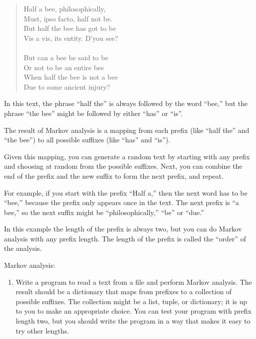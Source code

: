 \documentclass[10pt]{book}
\begin{document}
{\begin{quote}
Half a bee, philosophically, \\
Must, ipso facto, half not be. \\
But half the bee has got to be \\
Vis a vis, its entity. D'you see? \\
\\
But can a bee be said to be \\
Or not to be an entire bee \\
When half the bee is not a bee \\
Due to some ancient injury? \\
\end{quote}
%
In this text,
the phrase ``half the'' is always followed by the word ``bee,''
but the phrase ``the bee'' might be followed by either
``has'' or ``is''.


The result of Markov analysis is a mapping from each prefix
(like ``half the'' and ``the bee'') to all possible suffixes
(like ``has'' and ``is'').


Given this mapping, you can generate a random text by
starting with any prefix and choosing at random from the
possible suffixes.  Next, you can combine the end of the
prefix and the new suffix to form the next prefix, and repeat.

For example, if you start with the prefix ``Half a,'' then the
next word has to be ``bee,'' because the prefix only appears
once in the text.  The next prefix is ``a bee,'' so the
next suffix might be ``philosophically,'' ``be'' or ``due.''

In this example the length of the prefix is always two, but
you can do Markov analysis with any prefix length.  The length
of the prefix is called the ``order'' of the analysis.

\begin{ex}
Markov analysis:

\begin{enumerate}

\item Write a program to read a text from a file and perform Markov
analysis.  The result should be a dictionary that maps from
prefixes to a collection of possible suffixes.  The collection
might be a list, tuple, or dictionary; it is up to you to make
an appropriate choice.  You can test your program with prefix
length two, but you should write the program in a way that makes
it easy to try other lengths.


\end{enumerate}
\end{ex}}
\end{document}
